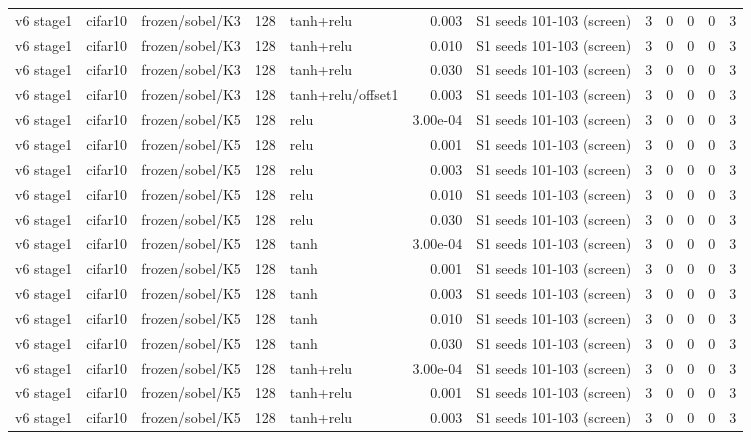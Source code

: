 \begin{table}[htbp]
{\begin{tabular}{@{}lllrlrlrrrrr@{}}
v6 stage1 & cifar10 & frozen/sobel/K3 & 128 & tanh+relu & 0.003 & S1 seeds 101-103 (screen) & 3 & 0 & 0 & 0 & 3 \\
v6 stage1 & cifar10 & frozen/sobel/K3 & 128 & tanh+relu & 0.010 & S1 seeds 101-103 (screen) & 3 & 0 & 0 & 0 & 3 \\
v6 stage1 & cifar10 & frozen/sobel/K3 & 128 & tanh+relu & 0.030 & S1 seeds 101-103 (screen) & 3 & 0 & 0 & 0 & 3 \\
v6 stage1 & cifar10 & frozen/sobel/K3 & 128 & tanh+relu/offset1 & 0.003 & S1 seeds 101-103 (screen) & 3 & 0 & 0 & 0 & 3 \\
v6 stage1 & cifar10 & frozen/sobel/K5 & 128 & relu & 3.00e-04 & S1 seeds 101-103 (screen) & 3 & 0 & 0 & 0 & 3 \\
v6 stage1 & cifar10 & frozen/sobel/K5 & 128 & relu & 0.001 & S1 seeds 101-103 (screen) & 3 & 0 & 0 & 0 & 3 \\
v6 stage1 & cifar10 & frozen/sobel/K5 & 128 & relu & 0.003 & S1 seeds 101-103 (screen) & 3 & 0 & 0 & 0 & 3 \\
v6 stage1 & cifar10 & frozen/sobel/K5 & 128 & relu & 0.010 & S1 seeds 101-103 (screen) & 3 & 0 & 0 & 0 & 3 \\
v6 stage1 & cifar10 & frozen/sobel/K5 & 128 & relu & 0.030 & S1 seeds 101-103 (screen) & 3 & 0 & 0 & 0 & 3 \\
v6 stage1 & cifar10 & frozen/sobel/K5 & 128 & tanh & 3.00e-04 & S1 seeds 101-103 (screen) & 3 & 0 & 0 & 0 & 3 \\
v6 stage1 & cifar10 & frozen/sobel/K5 & 128 & tanh & 0.001 & S1 seeds 101-103 (screen) & 3 & 0 & 0 & 0 & 3 \\
v6 stage1 & cifar10 & frozen/sobel/K5 & 128 & tanh & 0.003 & S1 seeds 101-103 (screen) & 3 & 0 & 0 & 0 & 3 \\
v6 stage1 & cifar10 & frozen/sobel/K5 & 128 & tanh & 0.010 & S1 seeds 101-103 (screen) & 3 & 0 & 0 & 0 & 3 \\
v6 stage1 & cifar10 & frozen/sobel/K5 & 128 & tanh & 0.030 & S1 seeds 101-103 (screen) & 3 & 0 & 0 & 0 & 3 \\
v6 stage1 & cifar10 & frozen/sobel/K5 & 128 & tanh+relu & 3.00e-04 & S1 seeds 101-103 (screen) & 3 & 0 & 0 & 0 & 3 \\
v6 stage1 & cifar10 & frozen/sobel/K5 & 128 & tanh+relu & 0.001 & S1 seeds 101-103 (screen) & 3 & 0 & 0 & 0 & 3 \\
v6 stage1 & cifar10 & frozen/sobel/K5 & 128 & tanh+relu & 0.003 & S1 seeds 101-103 (screen) & 3 & 0 & 0 & 0 & 3 \\

\end{tabular}}
\end{table}
